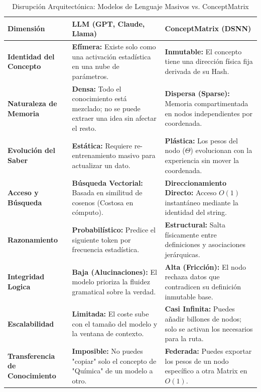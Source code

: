\documentclass[12pt]{article}
\begin{document}
\begin{table}[h!]
\centering
\caption{Disrupción Arquitectónica: Modelos de Lenguaje Masivos vs. ConceptMatrix}
\label{table:llm_vs_conceptmatrix}
\vspace{0.5cm}
\begin{tabular}{|p{3.5cm}|p{5cm}|p{5cm}|}
\hline
\textbf{Dimensión} & \textbf{LLM (GPT, Claude, Llama)} & \textbf{ConceptMatrix (DSNN)} \\ \hline
\textbf{Identidad del Concepto} & \textbf{Efímera:} Existe solo como una activación estadística en una nube de parámetros. & \textbf{Inmutable:} El concepto tiene una dirección física fija derivada de su Hash. \\ \hline
\textbf{Naturaleza de Memoria} & \textbf{Densa:} Todo el conocimiento está mezclado; no se puede extraer una idea sin afectar el resto. & \textbf{Dispersa (Sparse):} Memoria compartimentada en nodos independientes por coordenada. \\ \hline
\textbf{Evolución del Saber} & \textbf{Estática:} Requiere re-entrenamiento masivo para actualizar un dato. & \textbf{Plástica:} Los pesos del nodo ($\Theta$) evolucionan con la experiencia sin mover la coordenada. \\ \hline
\textbf{Acceso y Búsqueda} & \textbf{Búsqueda Vectorial:} Basada en similitud de cosenos (Costosa en cómputo). & \textbf{Direccionamiento Directo:} Acceso $O(1)$ instantáneo mediante la identidad del string. \\ \hline
\textbf{Razonamiento} & \textbf{Probabilístico:} Predice el siguiente token por frecuencia estadística. & \textbf{Estructural:} Salta físicamente entre definiciones y asociaciones jerárquicas. \\ \hline
\textbf{Integridad Logica} & \textbf{Baja (Alucinaciones):} El modelo prioriza la fluidez gramatical sobre la verdad. & \textbf{Alta (Fricción):} El nodo rechaza datos que contradicen su definición inmutable base. \\ \hline
\textbf{Escalabilidad} & \textbf{Limitada:} El coste sube con el tamaño del modelo y la ventana de contexto. & \textbf{Casi Infinita:} Puedes añadir billones de nodos; solo se activan los necesarios para la ruta. \\ \hline
\textbf{Transferencia de Conocimiento} & \textbf{Imposible:} No puedes "copiar" solo el concepto de "Química" de un modelo a otro. & \textbf{Federada:} Puedes exportar los pesos de un nodo específico a otra Matrix en $O(1)$. \\ \hline
\end{tabular}
\end{table}
\end{document}
